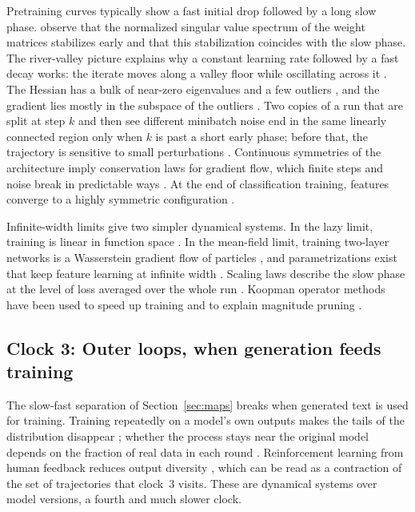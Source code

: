 Pretraining curves typically show a fast initial drop followed by a long slow phase. \citet{zhang2026stability} observe that the normalized singular value spectrum of the weight matrices stabilizes early and that this stabilization coincides with the slow phase. The river-valley picture explains why a constant learning rate followed by a fast decay works: the iterate moves along a valley floor while oscillating across it \citep{wen2024warmupstabledecay}. The Hessian has a bulk of near-zero eigenvalues and a few outliers \citep{sagun2017empirical,ghorbani2019investigation}, and the gradient lies mostly in the subspace of the outliers \citep{gurari2018gradient}. Two copies of a run that are split at step $k$ and then see different minibatch noise end in the same linearly connected region only when $k$ is past a short early phase; before that, the trajectory is sensitive to small perturbations \citep{frankle2019linear}. Continuous symmetries of the architecture imply conservation laws for gradient flow, which finite steps and noise break in predictable ways \citep{kunin2020neural}. At the end of classification training, features converge to a highly symmetric configuration \citep{papyan2020prevalence}.

Infinite-width limits give two simpler dynamical systems. In the lazy limit, training is linear in function space \citep{jacot2018neural}. In the mean-field limit, training two-layer networks is a Wasserstein gradient flow of particles \citep{mei2018mean,chizat2018global}, and parametrizations exist that keep feature learning at infinite width \citep{yang2020feature}. Scaling laws describe the slow phase at the level of loss averaged over the whole run \citep{kaplan2020scaling,hoffmann2022training}. Koopman operator methods have been used to speed up training and to explain magnitude pruning \citep{dogra2020optimizing,redman2021operator}.

\subsection{Clock 3: Outer loops, when generation feeds training}

The slow-fast separation of Section~\ref{sec:maps} breaks when generated text is used for training. Training repeatedly on a model's own outputs makes the tails of the distribution disappear \citep{shumailov2023curse,alemohammad2023selfconsuming}; whether the process stays near the original model depends on the fraction of real data in each round \citep{bertrand2023stability}. Reinforcement learning from human feedback reduces output diversity \citep{kirk2023effects}, which can be read as a contraction of the set of trajectories that clock~3 visits. These are dynamical systems over model versions, a fourth and much slower clock.

